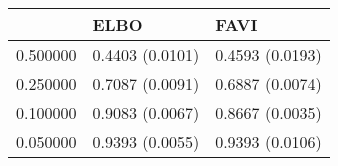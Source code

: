\begin{tabular}{lll}
\toprule
 & ELBO & FAVI \\
\midrule
0.500000 & 0.4403 (0.0101) & 0.4593 (0.0193) \\
0.250000 & 0.7087 (0.0091) & 0.6887 (0.0074) \\
0.100000 & 0.9083 (0.0067) & 0.8667 (0.0035) \\
0.050000 & 0.9393 (0.0055) & 0.9393 (0.0106) \\
\bottomrule
\end{tabular}
